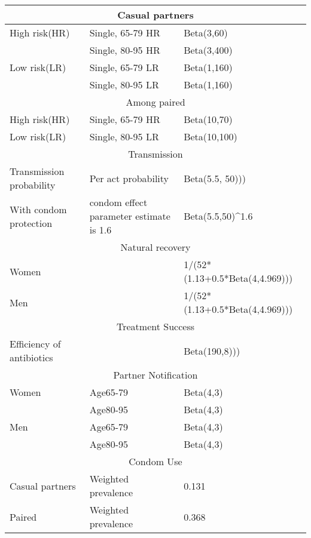 \documentclass{article}
\begin{document}
\begin{normalsize}
\begin{table}[H]
\begin{tabular}{ |p{5cm}|p{7cm}|p{5cm}| }
			\multicolumn{3}{|c|}{Casual partners} \\
			\hline
			High risk(HR)& Single, 65-79 HR	& Beta(3,60)\\
 						 & Single, 80-95 HR	& Beta(3,400)\\
			Low risk(LR)	 & Single, 65-79 LR	& Beta(1,160) \\
 						 & Single, 80-95 LR	&Beta(1,160)\\
 			\hline
 			\multicolumn{3}{|c|}{Among paired} \\
 			\hline
			High risk(HR)& Single, 65-79 HR	& Beta(10,70)\\
			Low risk(LR) & Single, 80-95 LR	& Beta(10,100)\\
			\hline
			
		\multicolumn{3}{|c|}{Transmission} \\
			\hline
			Transmission probability &Per act probability & Beta(5.5, 50)))\\
			With condom protection & condom effect parameter estimate is 1.6&Beta(5.5,50)^{1.6}\\
    		\hline
    		
		\multicolumn{3}{|c|}{Natural recovery} \\
			\hline
			Women & & 1/(52*(1.13+0.5*Beta(4,4.969)))\\
			Men & & 1/(52*(1.13+0.5*Beta(4,4.969)))\\

    		\hline
    	
    	\multicolumn{3}{|c|}{Treatment Success} \\
    	    \hline
			Efficiency of antibiotics & & Beta(190,8)))\\
    		\hline

    	\multicolumn{3}{|c|}{Partner Notification} \\
    	    \hline
			Women&Age65-79&Beta(4,3)\\
			&Age80-95&Beta(4,3)
			\\
			Men&Age65-79&Beta(4,3)\\
			&Age80-95&Beta(4,3)\\
    		\hline
        	\multicolumn{3}{|c|}{Condom Use} \\
    	    \hline
			Casual partners&Weighted prevalence & 0.131\\
			Paired & Weighted prevalence & 0.368
			\\
    		\hline
    		
	
        	
    		   		
    		

\end{tabular}
\end{table}
\end{normalsize}
\end{document}

